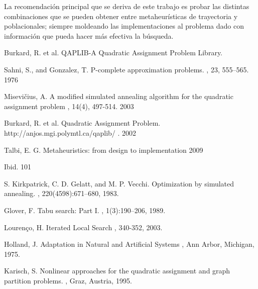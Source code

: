 \documentclass{ci5652}
\begin{document}
La recomendación principal que se deriva de este trabajo es probar las distintas combinaciones que se pueden obtener entre metaheurísticas de trayectoria y poblacionales; siempre moldeando las implementaciones al problema dado con información que pueda hacer más efectiva la búsqueda.


\small


\begin{thebibliography}{99}

Burkard, R. et al.
\newblock QAPLIB-A Quadratic Assignment Problem Library.

Sahni, S., and Gonzalez, T.
\newblock P-complete approximation problems.
, 23, 555–565. 1976

Misevičius, A.
\newblock A modified simulated annealing algorithm for the quadratic assignment problem
, 14(4), 497-514. 2003

Burkard, R. et al.
\newblock Quadratic Assignment Problem.
\newblock http://anjos.mgi.polymtl.ca/qaplib/ . 2002

Talbi, E. G. 
\newblock Metaheuristics: from design to implementation
 2009

Ibid. 101

S. Kirkpatrick, C. D. Gelatt, and M. P. Vecchi. 
\newblock Optimization by simulated annealing.
, 220(4598):671–680, 1983.

Glover, F. 
\newblock Tabu search: Part I. 
, 1(3):190–206, 1989.

Lourenço, H.
\newblock Iterated Local Search
, 340-352, 2003.

Holland, J.
\newblock Adaptation in Natural and Artificial Systems 
, Ann Arbor, Michigan, 1975.

Karisch, S. 
\newblock Nonlinear approaches for the quadratic assignment and graph partition problems.
, Graz, Austria, 1995.


\end{thebibliography}
\end{document}
